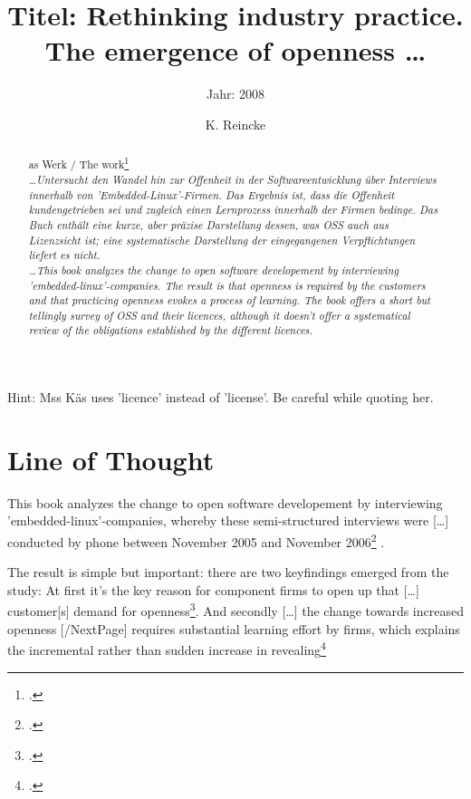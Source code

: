 \documentclass[DIV=calc,BCOR=5mm,11pt,headings=small,oneside,abstract=true, toc=bib]{scrartcl}
\begin{document}

\titlehead{Literaturexzerpt}
\subject{Autor(en): Käs}
\title{Titel: Rethinking industry practice. The emergence of openness \ldots}
\subtitle{Jahr: 2008}
\author{K. Reincke}

\maketitle

\begin{abstract}
\noindent
as Werk / The work\footcite[][]{Kaes2008a} \\
\noindent \itshape
\ldots Untersucht den Wandel hin zur Offenheit in der Softwareentwicklung über
Interviews innerhalb von 'Embedded-Linux'-Firmen. Das Ergebnis ist, dass die
Offenheit kundengetrieben sei und zugleich einen Lernprozess innerhalb der
Firmen bedinge. Das Buch enthält eine kurze, aber präzise Darstellung dessen,
was OSS auch aus Lizenzsicht ist; eine systematische Darstellung der
eingegangenen Verpflichtungen liefert es nicht.\\
\noindent
\ldots This book analyzes the change to open software developement by
interviewing 'embedded-linux'-companies. The result is that openness is required by the
customers and that practicing openness evokes a process of learning. The book
offers a short but tellingly survey of OSS and their licences, although it
doesn't offer a systematical review of the obligations established by the
different licences.
\end{abstract}
\footnotesize
\normalsize

Hint: Mss Käs uses 'licence' instead of 'license'. Be careful while quoting her.
\section{Line of Thought}

This book analyzes the change to open software developement by
interviewing 'embedded-linux'-companies, whereby these
\glqq{}semi-structured interviews\grqq{} were \glqq{}[\ldots] conducted
by phone between November 2005 and November
2006\grqq{}\footcite[cf][100f]{Kaes2008a} . 

The result is simple but important: there are \glqq{}two keyfindings emerged
from the study\grqq{}: At first it's the \glqq{}key reason for component firms
to open up\grqq{} that \glqq{}[\ldots] customer[s] demand for
openness\grqq{}\footcite[cf.][212]{Kaes2008a}. And secondly \glqq{}[\ldots] the
change towards increased openness [/NextPage] requires substantial learning
effort by firms, which explains the incremental rather than sudden increase in
revealing\grqq{}\footcite[cf.][212f]{Kaes2008a}
\end{document}
